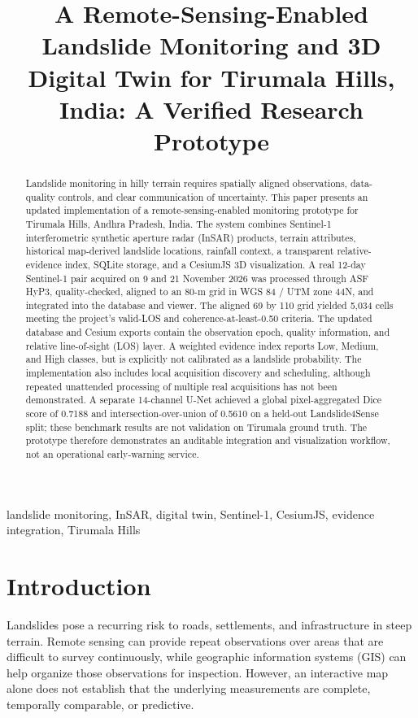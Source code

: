 \documentclass[conference]{IEEEtran}
\title{A Remote-Sensing-Enabled Landslide Monitoring and 3D Digital Twin for Tirumala Hills, India: A Verified Research Prototype}
\author{
\IEEEauthorblockN{Author Name(s)}
\IEEEauthorblockA{
\textit{Department / Institution}\\
City, State, India\\
email address(es)}
}
\begin{document}
\maketitle

\begin{abstract}
Landslide monitoring in hilly terrain requires spatially aligned observations,
data-quality controls, and clear communication of uncertainty. This paper
presents an updated implementation of a remote-sensing-enabled monitoring
prototype for Tirumala Hills, Andhra Pradesh, India. The system combines
Sentinel-1 interferometric synthetic aperture radar (InSAR) products, terrain
attributes, historical map-derived landslide locations, rainfall context, a
transparent relative-evidence index, SQLite storage, and a CesiumJS 3D
visualization. A real 12-day Sentinel-1 pair acquired on 9 and 21 November 2026
was processed through ASF HyP3, quality-checked, aligned to an 80-m grid in
WGS 84 / UTM zone 44N, and integrated into the database and viewer. The aligned
69 by 110 grid yielded 5,034 cells meeting the project's valid-LOS and
coherence-at-least-0.50 criteria. The updated database and Cesium exports
contain the observation epoch, quality information, and relative line-of-sight
(LOS) layer. A weighted evidence index reports Low, Medium, and High classes,
but is explicitly not calibrated as a landslide probability. The implementation
also includes local acquisition discovery and scheduling, although repeated
unattended processing of multiple real acquisitions has not been demonstrated.
A separate 14-channel U-Net achieved a global pixel-aggregated Dice score of
0.7188 and intersection-over-union of 0.5610 on a held-out Landslide4Sense
split; these benchmark results are not validation on Tirumala ground truth.
The prototype therefore demonstrates an auditable integration and
visualization workflow, not an operational early-warning service.
\end{abstract}

\begin{IEEEkeywords}
landslide monitoring, InSAR, digital twin, Sentinel-1, CesiumJS, evidence
integration, Tirumala Hills
\end{IEEEkeywords}

\section{Introduction}
Landslides pose a recurring risk to roads, settlements, and infrastructure in
steep terrain. Remote sensing can provide repeat observations over areas that
are difficult to survey continuously, while geographic information systems
(GIS) can help organize those observations for inspection. However, an
interactive map alone does not establish that the underlying measurements are
complete, temporally comparable, or predictive.
\end{document}
